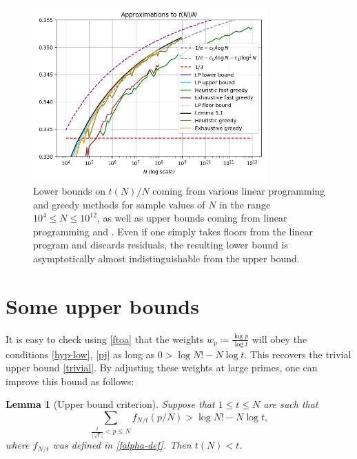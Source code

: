 \documentclass[12pt,a4paper,reqno]{amsart}
\numberwithin{equation}{section}
\theoremstyle{plain}
\newtheorem{lemma}[theorem]{Lemma}
\theoremstyle{definition}
\begin{document}
\begin{figure}
  \centering
  \includegraphics[width=0.8\textwidth]{verylarge.png}
  \caption{Lower bounds on $t(N)/N$ coming from various linear programming and greedy methods for sample values of $N$ in the range $10^4 \leq N \leq 10^{12}$, as well as upper bounds coming from linear programming and .  Even if one simply takes floors from the linear program and discards residuals, the resulting lower bound is asymptotically almost indistinguishable from the upper bound. }\label{fig-verylarge}
\end{figure}



\section{Some upper bounds}\label{upper-sec}

It is easy to check using \eqref{ftoa} that the weights $w_p \coloneqq \frac{\log p}{\log t}$ will obey the conditions \eqref{hyp-low}, \eqref{pj} as long as $0 > \log N! - N \log t$.  This recovers the trivial upper bound \eqref{trivial}.  By adjusting these weights at large primes, one can improve this bound as follows:

\begin{lemma}[Upper bound criterion]\label{upper-crit}  Suppose that $1 \leq t \leq N$ are such that
  \begin{equation}\label{contra}
     \sum_{\frac{t}{\lfloor\sqrt{t}\rfloor} < p \leq N} f_{N/t}(p/N) > \log N! - N \log t,
  \end{equation}
  where $f_{N/t}$ was defined in \eqref{falpha-def}.
  Then $t(N) < t$.
  \end{lemma}
\end{document}
